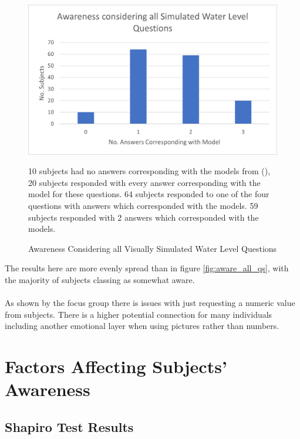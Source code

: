 \begin{figure}[H]
    \centering
    \includegraphics{fig_results/Awareness_ all_simulation_pictures_qs.png}
    \caption{Awareness Considering all Visually Simulated Water Level Questions}{ 10 subjects had no answers corresponding with the models from (\cite{kartverket_se_2021}), 20 subjects responded with every answer corresponding with the model for these questions. 64 subjects responded to one of the four questions with answers which corresponded with the models. 59 subjects responded with 2 answers which corresponded with the models. }
    \label{fig:aware_all_edited_photo}
\end{figure}


The results here are more evenly spread than in figure \ref{fig:aware_all_qs}, with the majority of subjects classing as somewhat aware.
\paragraph{}
 


\paragraph{}
As shown by the focus group there is issues with just requesting a numeric value from subjects. There is a higher potential connection for many individuals including another emotional layer when using pictures rather than numbers. 

\section{Factors Affecting Subjects' Awareness}
  

\subsection{Shapiro Test Results}

